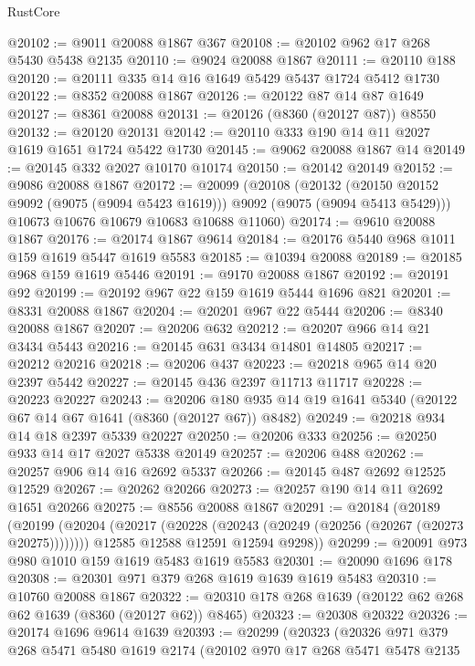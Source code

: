 \begin{lexlean}{RustCore}
\begin{coremodule}
@20102 := @9011 @20088 @1867 @367
@20108 := @20102 @962 @17 @268 @5430 @5438 @2135
@20110 := @9024 @20088 @1867
@20111 := @20110 @188
@20120 := @20111 @335 @14 @16 @1649 @5429 @5437 @1724 @5412 @1730
@20122 := @8352 @20088 @1867
@20126 := @20122 @87 @14 @87 @1649
@20127 := @8361 @20088
@20131 := @20126 (@8360 (@20127 @87)) @8550
@20132 := @20120 @20131
@20142 := @20110 @333 @190 @14 @11 @2027 @1619 @1651 @1724 @5422 @1730
@20145 := @9062 @20088 @1867 @14
@20149 := @20145 @332 @2027 @10170 @10174
@20150 := @20142 @20149
@20152 := @9086 @20088 @1867
@20172 := @20099
    (@20108
      (@20132 (@20150 @20152 @9092 (@9075 (@9094 @5423 @1619))) @9092 (@9075 (@9094 @5413 @5429)))
      @10673
      @10676
      @10679
      @10683
      @10688
      @11060)
@20174 := @9610 @20088 @1867
@20176 := @20174 @1867 @9614
@20184 := @20176 @5440 @968 @1011 @159 @1619 @5447 @1619 @5583
@20185 := @10394 @20088
@20189 := @20185 @968 @159 @1619 @5446
@20191 := @9170 @20088 @1867
@20192 := @20191 @92
@20199 := @20192 @967 @22 @159 @1619 @5444 @1696 @821
@20201 := @8331 @20088 @1867
@20204 := @20201 @967 @22 @5444
@20206 := @8340 @20088 @1867
@20207 := @20206 @632
@20212 := @20207 @966 @14 @21 @3434 @5443
@20216 := @20145 @631 @3434 @14801 @14805
@20217 := @20212 @20216
@20218 := @20206 @437
@20223 := @20218 @965 @14 @20 @2397 @5442
@20227 := @20145 @436 @2397 @11713 @11717
@20228 := @20223 @20227
@20243 := @20206 @180 @935 @14 @19 @1641 @5340 (@20122 @67 @14 @67 @1641 (@8360 (@20127 @67)) @8482)
@20249 := @20218 @934 @14 @18 @2397 @5339 @20227
@20250 := @20206 @333
@20256 := @20250 @933 @14 @17 @2027 @5338 @20149
@20257 := @20206 @488
@20262 := @20257 @906 @14 @16 @2692 @5337
@20266 := @20145 @487 @2692 @12525 @12529
@20267 := @20262 @20266
@20273 := @20257 @190 @14 @11 @2692 @1651 @20266
@20275 := @8556 @20088 @1867
@20291 := @20184
    (@20189
      (@20199
        (@20204 (@20217 (@20228 (@20243 (@20249 (@20256 (@20267 (@20273 @20275))))))))
        @12585
        @12588
        @12591
        @12594
        @9298))
@20299 := @20091 @973 @980 @1010 @159 @1619 @5483 @1619 @5583
@20301 := @20090 @1696 @178
@20308 := @20301 @971 @379 @268 @1619 @1639 @1619 @5483
@20310 := @10760 @20088 @1867
@20322 := @20310 @178 @268 @1639 (@20122 @62 @268 @62 @1639 (@8360 (@20127 @62)) @8465)
@20323 := @20308 @20322
@20326 := @20174 @1696 @9614 @1639
@20393 := @20299
    (@20323
      (@20326
        @971
        @379
        @268
        @5471
        @5480
        @1619
        @2174
        (@20102
          @970
          @17
          @268
          @5471
          @5478
          @2135

\end{coremodule}
\end{lexlean}
